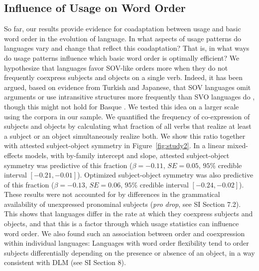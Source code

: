 \documentclass[11pt,a4paper]{article}
\begin{document}
\subsection*{Influence of Usage on Word Order}
So far, our results provide evidence for coadaptation between usage and basic word order in the evolution of language.
In what aspects of usage patterns do languages vary and change that reflect this coadaptation?
That is, in what ways do usage patterns influence which basic word order is optimally efficient?
We hypothesize that languages favor SOV-like orders more when they do not frequently coexpress subjects and objects on a single verb.
Indeed, it has been argued, based on evidence from Turkish and Japanese, that SOV languages omit arguments or use intransitive structures more frequently than SVO languages do \citep{hiranuma1999syntactic,ueno2009does,luk2014investigating}, though this might not hold for Basque \citep{pastor2013processing}.
We tested this idea on a larger scale using the corpora in our sample.
We quantified the frequency of co-expression of subjects and objects by calculating what fraction of all verbs that realize at least a subject or an object simultaneously realize both.
We show this ratio together with attested subject-object symmetry in Figure~\ref{fig:study2}.
In a linear mixed-effects models, with by-family intercept and slope, attested subject-object symmetry was predictive of this fraction ($\beta=-0.11$, $SE=0.05$, $95\%$ credible interval $[-0.21, -0.01]$).
Optimized subject-object symmetry was also predictive of this fraction ($\beta=-0.13$, $SE=0.06$, $95\%$ credible interval $[-0.24,  -0.02]$).
These results were not accounted for by differences in the grammatical availability of unexpressed pronominal subjects (\textit{pro drop}, see SI Section 7.2).
This shows that languages differ in the rate at which they coexpress subjects and objects, and that this is a factor through which usage statistics can influence word order.
We also found such an association between order and coexpression within individual languages: Languages with word order flexibility tend to order subjects differentially depending on the presence or absence of an object, in a way consistent with DLM (see SI Section 8).
\end{document}
